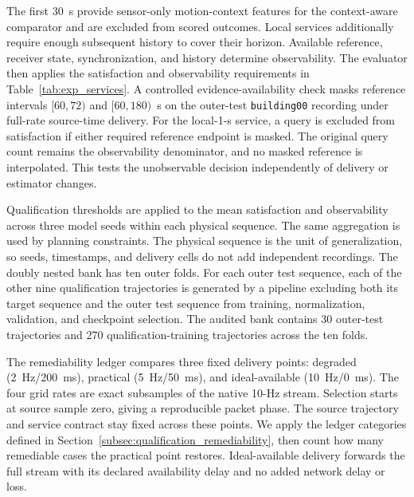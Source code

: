 \documentclass[journal]{IEEEtran}
\newcommand{\rev}[1]{#1}
\newcommand{\revision}[1]{#1}
\begin{document}
The first 30~s provide sensor-only motion-context features for the
context-aware comparator and are excluded from scored outcomes. Local
services additionally require enough subsequent history to cover their
horizon. Available reference, receiver state, synchronization, and history
determine observability. The evaluator then applies the satisfaction and
observability requirements in Table~\ref{tab:exp_services}.
\revision{A controlled evidence-availability check masks reference
intervals $[60,72)$ and $[60,180)$~s on the outer-test
\texttt{building00} recording under full-rate source-time delivery.
For the local-1-s service, a query is excluded from satisfaction if
either required reference endpoint is masked. The original query count
remains the observability denominator, and no masked reference is
interpolated. This tests the unobservable decision independently of
delivery or estimator changes.}

\rev{Qualification thresholds are applied to the mean satisfaction and
observability across three model seeds within each physical sequence.
The same aggregation is used by planning constraints. The physical
sequence is the unit of generalization, so seeds, timestamps, and delivery
cells do not add independent recordings.} The doubly nested bank has ten outer folds.
For each outer test sequence, each of the other nine qualification
trajectories is generated by a pipeline excluding both its target sequence
and the outer test sequence from training, normalization, validation, and
checkpoint selection. The audited bank contains 30 outer-test trajectories
and 270 qualification-training trajectories across the ten folds.

The remediability ledger compares three fixed delivery points:
degraded (2~Hz/200~ms), practical (5~Hz/50~ms), and ideal-available
(10~Hz/0~ms). \rev{The four grid rates are exact subsamples of the native
10-Hz stream. Selection starts at source sample zero, giving a reproducible
packet phase.} \revision{The source trajectory and service contract stay
fixed across these points. We apply the ledger categories defined in
Section~\ref{subsec:qualification_remediability}, then count how many remediable cases the practical point
restores. Ideal-available delivery forwards the full stream with its
declared availability delay and no added network delay or loss.}
\end{document}
